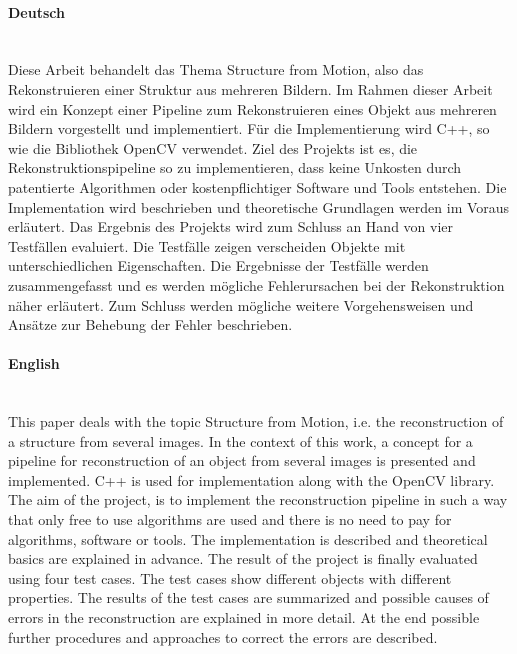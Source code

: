 
\paragraph{Deutsch}\mbox{}\\
Diese Arbeit behandelt das Thema Structure from Motion, also das Rekonstruieren einer Struktur aus mehreren Bildern.
Im Rahmen dieser Arbeit wird ein Konzept einer Pipeline zum Rekonstruieren eines Objekt aus mehreren Bildern vorgestellt und implementiert.
Für die Implementierung wird C++, so wie die Bibliothek OpenCV verwendet.
Ziel des Projekts ist es, die Rekonstruktionspipeline so zu implementieren, dass keine Unkosten durch patentierte Algorithmen oder kostenpflichtiger Software und Tools entstehen.
Die Implementation wird beschrieben und theoretische Grundlagen werden im Voraus erläutert. 
Das Ergebnis des Projekts wird zum Schluss an Hand von vier Testfällen evaluiert.
Die Testfälle zeigen verscheiden Objekte mit unterschiedlichen Eigenschaften.
Die Ergebnisse der Testfälle werden zusammengefasst und es werden mögliche Fehlerursachen bei der Rekonstruktion näher erläutert.
Zum Schluss werden mögliche weitere Vorgehensweisen und Ansätze zur Behebung der Fehler beschrieben. 

\paragraph{English}\mbox{}\\
This paper deals with the topic Structure from Motion, i.e. the reconstruction of a structure from several images.
In the context of this work, a concept for a pipeline for reconstruction of an object from several images is presented and implemented.
C++ is used for implementation along with the OpenCV library.
The aim of the project, is to implement the reconstruction pipeline in such a way that only free to use algorithms are used and there is no need to pay for algorithms, software or tools.
The implementation is described and theoretical basics are explained in advance.
The result of the project is finally evaluated using four test cases.
The test cases show different objects with different properties.
The results of the test cases are summarized and possible causes of errors in the reconstruction are explained in more detail.
At the end possible further procedures and approaches to correct the errors are described.